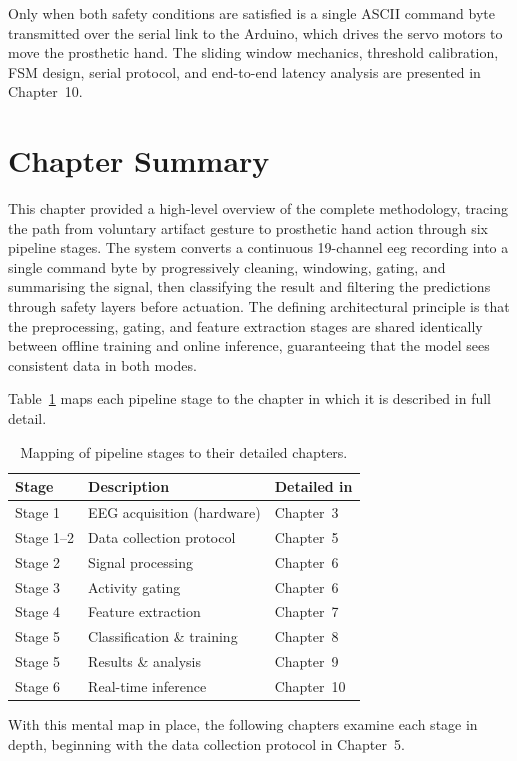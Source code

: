 Only when both safety conditions are satisfied is a single ASCII
command byte transmitted over the serial link to the Arduino, which
drives the servo motors to move the prosthetic hand. The sliding
window mechanics, threshold calibration, FSM design, serial
protocol, and end-to-end latency analysis are presented in
Chapter~10.

\section{Chapter Summary}
\label{sec:mo_summary}

This chapter provided a high-level overview of the complete
methodology, tracing the path from voluntary artifact gesture to
prosthetic hand action through six pipeline stages. The system
converts a continuous 19-channel \acrshort{eeg} recording into a
single command byte by progressively cleaning, windowing, gating,
and summarising the signal, then classifying the result and
filtering the predictions through safety layers before actuation.
The defining architectural principle is that the preprocessing,
gating, and feature extraction stages are shared identically between
offline training and online inference, guaranteeing that the model
sees consistent data in both modes.

Table~\ref{tab:mo_chapter_map} maps each pipeline stage to the
chapter in which it is described in full detail.

\begin{table}[htbp]
\centering
\caption{Mapping of pipeline stages to their detailed chapters.}
\label{tab:mo_chapter_map}
\renewcommand{\arraystretch}{1.3}
\begin{tabular}{l l l}
\toprule
\textbf{Stage} & \textbf{Description} & \textbf{Detailed in} \\
\midrule
Stage 1    & EEG acquisition (hardware)   & Chapter~3 \\
Stage 1--2 & Data collection protocol     & Chapter~5 \\
Stage 2    & Signal processing            & Chapter~6 \\
Stage 3    & Activity gating              & Chapter~6 \\
Stage 4    & Feature extraction           & Chapter~7 \\
Stage 5    & Classification \& training    & Chapter~8 \\
Stage 5    & Results \& analysis           & Chapter~9 \\
Stage 6    & Real-time inference          & Chapter~10 \\
\bottomrule
\end{tabular}
\end{table}

With this mental map in place, the following chapters examine each
stage in depth, beginning with the data collection protocol in
Chapter~5.
